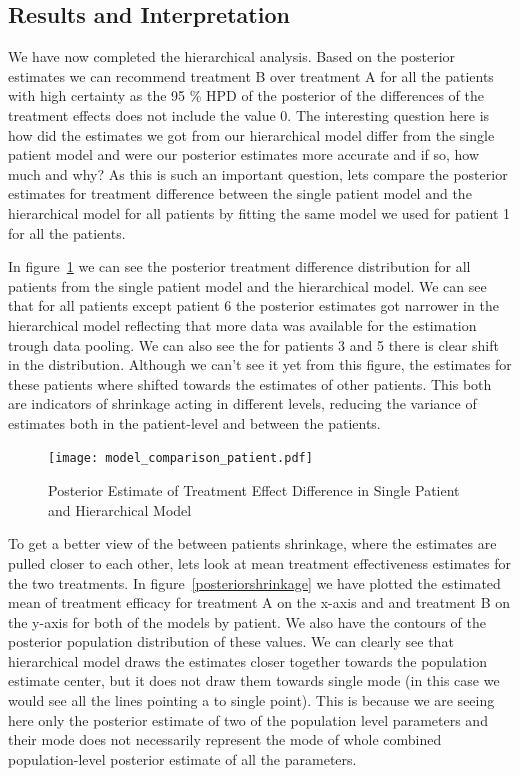 \documentclass[12pt,a4paper,leqno]{report}
\theoremstyle{plain}
\theoremstyle{definition}
\theoremstyle{remark}
\begin{document}
\subsection{Results and Interpretation}

We have now completed the hierarchical analysis. Based on the posterior estimates we can
recommend treatment B over treatment A for all the patients with high certainty
as the 95 \% HPD of the posterior of the differences of the treatment effects does not
include the value 0. The interesting question here is how did the estimates we got from
our hierarchical model differ from the single patient model and were our posterior
estimates more accurate and if so, how much and why? As this is such an important
question, lets compare the posterior estimates for treatment difference between the
single patient model and the hierarchical model for all patients by fitting the same model
we used for patient 1 for all the patients.

In figure\ \ref{modelcomparisonpatient} we can see the posterior treatment difference
distribution for all patients from the single patient model and the hierarchical model.
We can see that for all patients except patient 6 the posterior estimates got narrower
in the hierarchical model reflecting that more data was available for the estimation
trough data pooling. We can also see the for patients 3 and 5 there is clear shift in
the distribution. Although we can't see it yet from this figure, the estimates for these
patients where shifted towards the estimates of other patients. This both are indicators
of shrinkage acting in different levels, reducing the variance of estimates both in the
patient-level and between the patients.

\bigskip
\begin{figure}[H]
    \caption{Posterior Estimate of Treatment Effect Difference in Single Patient and Hierarchical Model}\label{modelcomparisonpatient}
    \bigskip
    \texttt{[image: model\_comparison\_patient.pdf]}
\end{figure}
\bigskip

To get a better view of the between patients shrinkage, where the estimates are pulled
closer to each other, lets look at mean treatment effectiveness estimates for the two treatments.
In figure\ \ref{posteriorshrinkage} we have plotted the estimated mean of
treatment efficacy for treatment A on the x-axis and and treatment B on the y-axis for
both of the models by patient. We also have the contours of the posterior population
distribution of these values. We can clearly see that hierarchical model draws
the estimates closer together towards the population estimate center, but it does not draw them towards single
mode (in this case we would see all the lines pointing a to single point). This is
because we are seeing here only the posterior estimate of two of the population level
parameters and their mode does not necessarily represent the mode of whole combined
population-level posterior estimate of all the parameters.
\end{document}
